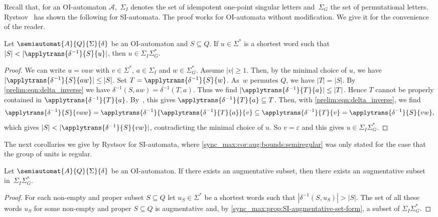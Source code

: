 Recall that, for an OI-automaton $\mathcal A$,~$\Sigma_I$
denotes the set of idempotent one-point singular letters and~$\Sigma_G$ the set of permutational letters.
Rystsov~\cite[Lem.~2]{Rystsov2000} has shown the following for SI-automata.
The proof works for OI-automata without modification. We give it for the convenience of the reader.

\begin{proposition} \label{sync_max:prop:SI-augmentative-set-form}
	Let $\semiautomat{A}{Q}{\Sigma}{\delta}$
	be an OI-automaton and $S \subseteq Q$.
	If $u \in \Sigma^*$ is a shortest word such
	that $|S| < |\applytrans{\delta^{-1}}{S}{u}|$,
	then $u \in \Sigma_I\Sigma_G^*$.	
\end{proposition}
\begin{proof}
	We can write $u = vaw$
	with $v \in \Sigma^*$, $a \in \Sigma_I$ and $w \in \Sigma_G^*$.
	Assume $|v| \ge 1$.
	Then, by the minimal choice of $u$,
	we have $|\applytrans{\delta^{-1}}{S}{aw}| \le |S|$.
	Set $T = \applytrans{\delta^{-1}}{S}{w}$.
	As~$w$ permutes $Q$, we have $|T| = |S|$.
	By \cref{prelim:eqn:delta_inverse}
	we have $\delta^{-1}(S, aw) = \delta^{-1}(T, a)$. Thus we find
	$|\applytrans{\delta^{-1}}{T}{a}| \le |T|$.
	Hence $T$ cannot be properly contained in $\applytrans{\delta^{-1}}{T}{a}$.
	By~,
	this gives $\applytrans{\delta^{-1}}{T}{a} \subseteq T$.	
	Then, with \cref{prelim:eqn:delta_inverse}, we find
	\[
	 \applytrans{\delta^{-1}}{S}{vaw}
	 = \applytrans{\delta^{-1}}{\applytrans{\delta^{-1}}{T}{a}}{v}
	 \subseteq \applytrans{\delta^{-1}}{T}{v} = \applytrans{\delta^{-1}}{S}{vw},
	\]
	which gives $|S| < |\applytrans{\delta^{-1}}{S}{vw}|$, 
	contradicting the minimal choice of $u$. So $v = \varepsilon$ and this gives $u \in \Sigma_I\Sigma_G^*$.
\end{proof}

The next corollaries we give by Rystsov\cite{Rystsov2000,Rystsov2022} 
for SI-automata, where \cref{sync_max:cor:aug:bounds:semiregular} was only stated
for the case that the group of units is regular.

\begin{corollary}
	\label{sync_max:cor:augmentative_subset_IG}
	Let $\semiautomat{A}{Q}{\Sigma}{\delta}$ be an OI-automaton.
	If there exists an augmentative subset,
	then there exists an augmentative subset in~$\Sigma_I \Sigma_G^*$. 
\end{corollary}
\begin{proof}
	For each non-empty and proper subset $S \subseteq Q$
	let $u_S \in \Sigma^*$ be a shortest
	words such that $|\delta^{-1}(S, u_S)| > |S|$.
	The set of all these words $u_S$ for some non-empty and proper $S \subseteq Q$
	is augmentative and, by \cref{sync_max:prop:SI-augmentative-set-form},
	a subset of $\Sigma_I \Sigma_G^*$.	
\end{proof}

